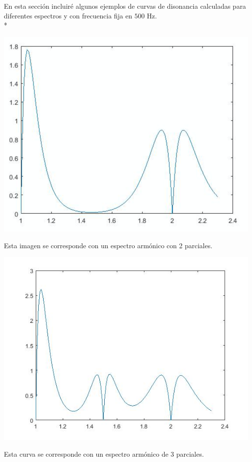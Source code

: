 \documentclass[11pt,a4paper]{article}
\begin{document}
	En esta sección incluiré algunos ejemplos de curvas de disonancia calculadas para diferentes espectros y con frecuencia fija en $500$ Hz.
	\\*
	
	 
    \begin{center}\includegraphics[scale=.5]{1_2.png}
	
	Esta imagen se corresponde con un espectro armónico con 2 parciales.\end{center}
	
    \begin{center}\includegraphics[scale=.5]{Espectro1_3.jpg}
	
	Esta curva se corresponde con un espectro armónico de 3 parciales.\end{center}
	
\end{document}
